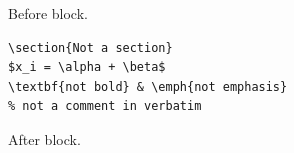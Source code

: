 Before block.

\begin{verbatim}
\section{Not a section}
$x_i = \alpha + \beta$
\textbf{not bold} & \emph{not emphasis}
% not a comment in verbatim
\end{verbatim}

After block.
